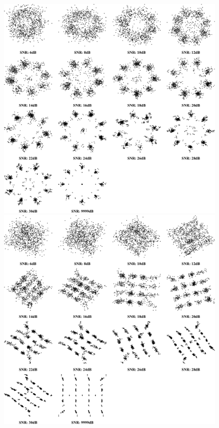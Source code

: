 {
    \begin{figure}[!htbp]
        \centering
        \begin{minipage}{0.48\textwidth}
            \centering
            \includegraphics[scale=0.15]{img/constellations/cropped_constellation8PSK.pdf}
        \end{minipage}
        \hfill
        \begin{minipage}{0.48\textwidth}
            \centering
            \includegraphics[scale=0.15]{img/constellations/cropped_constellation16QAM.pdf}
        \end{minipage}
    \end{figure}
}



